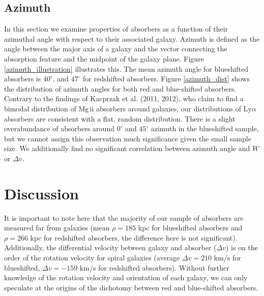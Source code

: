\documentclass[iop]{emulateapj-rtx4}
\begin{document}
\subsection{Azimuth}
In this section we examine properties of absorbers as a function of their azimuthal angle with respect to their associated galaxy. Azimuth is defined as the angle between the major axis of a galaxy and the vector connecting the absorption feature and the midpoint of the galaxy plane. Figure \ref{azimuth_illustration} illustrates this. The mean azimuth angle for blueshifted absorbers is $40^{\circ}$, and $47^{\circ}$ for redshifted absorbers. Figure \ref{azimuth_dist} shows the distribution of azimuth angles for both red and blue-shifted absorbers. Contrary to the findings of Kacprzak et al. (2011, 2012), who claim to find a bimodal distribution of Mg\,{\sc ii} absorbers around galaxies, our distributions of Ly$\alpha$ absorbers are consistent with a flat, random distribution. There is a slight overabundance of absorbers around $0^{\circ}$ and $45^{\circ}$ azimuth in the blueshifted sample, but we cannot assign this observation much significance given the small sample size. We additionally find no significant correlation between azimuth angle and $W$ or $\Delta v$. 






\section{Discussion}

It is important to note here that the majority of our sample of absorbers are measured far from galaxies (mean $\rho = 185$ kpc for blueshifted absorbers and $\rho = 266$ kpc for redshifted absorbers, the difference here is not significant). Additionally, the differential velocity between galaxy and absorber ($\Delta v$) is on the order of the rotation velocity for spiral galaxies (average $\Delta v = 210$ km/s for blueshifted, $\Delta v = -159$ km/s for redshifted absorbers). Without further knowledge of the rotation velocity and orientation of each galaxy, we can only speculate at the origins of the dichotomy between red and blue-shifted absorbers.
\end{document}
